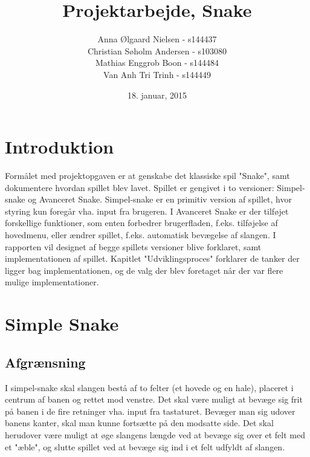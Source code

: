 \documentclass{report}
\begin{document}
\setcounter{chapter}{0}

\title{Projektarbejde, Snake}
\date{18. januar, 2015}
\author{	Anna Ølgaard Nielsen - s144437\\
			Christian Søholm Andersen - s103080\\
			Mathias Enggrob Boon - s144484\\
			Van Anh Tri Trinh - s144449}
\maketitle

\tableofcontents
\newpage
\setcounter{chapter}{0}
\chapter{Introduktion}
Formålet med projektopgaven er at genskabe det klassiske spil "Snake", samt dokumentere hvordan spillet blev lavet.
Spillet er gengivet i to versioner: Simpel-snake og Avanceret Snake. Simpel-snake er en primitiv version af spillet, hvor styring kun foregår vha. input fra brugeren. I Avanceret Snake er der tilføjet forskellige funktioner, som enten forbedrer brugerfladen, f.eks. tilføjelse af hovedmenu, eller ændrer spillet, f.eks. automatisk bevægelse af slangen.
I rapporten vil designet af begge spillets versioner blive forklaret, samt implementationen af spillet. Kapitlet "Udviklingsproces" forklarer de tanker der ligger bag implementationen, og de valg der blev foretaget når der var flere mulige implementationer.

\chapter{Simple Snake}
\section{Afgrænsning}
I simpel-snake skal slangen bestå af to felter (et hovede og en hale), placeret i centrum af banen og rettet mod venstre. Det skal være muligt at bevæge sig frit på banen i de fire retninger vha. input fra tastaturet. Bevæger man sig udover banens kanter, skal man kunne fortsætte på den modsatte side. Det skal herudover være muligt  at øge slangens længde ved at bevæge sig over et felt med et "æble", og slutte spillet ved at bevæge sig ind i et felt udfyldt af slangen.
\linebreak
\end{document}
